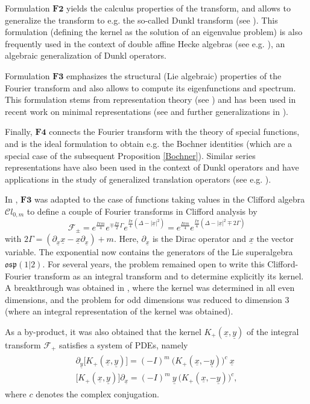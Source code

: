 \documentclass{amsart}
\theoremstyle{remark}
\begin{document}
Formulation $\textbf{F2}$ yields the calculus properties of the transform, and allows to generalize the transform to e.g. the so-called Dunkl transform (see \cite{deJ}). This formulation (defining the kernel as the solution of an eigenvalue problem) is also frequently used in the context of double affine Hecke algebras (see e.g. \cite{C, J}), an algebraic generalization of Dunkl operators. 

Formulation $\textbf{F3}$ emphasizes the structural (Lie algebraic) properties of the Fourier transform and also allows to compute its eigenfunctions and spectrum. This formulation stems from representation theory (see \cite{MR0983366, MR0974332}) and has been used in recent work on minimal representations (see \cite{MR2134314, MR2401813} and further generalizations in \cite{Orsted2}).

Finally, $\textbf{F4}$ connects the Fourier transform with the theory of special functions, and is the ideal formulation to obtain e.g. the Bochner identities (which are a special case of the subsequent Proposition \ref{Bochner}). Similar series representations have also been used in the context of Dunkl operators and have applications in the study of generalized translation operators (see e.g. \cite{MR1973996, DBXu}).

In \cite{MR2190678}, $\textbf{F3}$ was adapted to the case of functions taking values in the Clifford algebra ${\mathcal{C}} l_{0,m}$ to define a couple of Fourier transforms in Clifford analysis by
\[
{\mathcal{F}}_{\pm} =  e^{ \frac{I \pi m}{4}} e^{\mp \frac{I \pi}{2}\Gamma  }e^{\frac{I \pi}{4}(\Delta - |{\underline{x}}|^{2})} = e^{ \frac{I \pi m}{4}} e^{\frac{I \pi}{4}(\Delta - |{\underline{x}}|^{2} \mp 2\Gamma)}
\]
with $2\Gamma= ({\partial_{\underline{x}}} {\underline{x}} - {\underline{x}} {\partial_{\underline{x}}})+m$. Here, ${\partial_{\underline{x}}}$ is the Dirac operator and ${\underline{x}}$ the vector variable. The exponential now contains the generators of the Lie superalgebra $\mathfrak{osp}(1|2)$. For several years, the problem remained open to write this Clifford-Fourier transform as an integral transform and to determine explicitly its kernel. A breakthrough was obtained in \cite{DBXu}, where the kernel was determined in all even dimensions, and the problem for odd dimensions was reduced to dimension 3 (where an integral representation of the kernel was obtained).

As a by-product, it was also obtained that the kernel $K_+({\underline{x}},{\underline{y}})$ of the integral transform ${\mathcal{F}}_{+}$ satisfies a system of PDEs, namely
\begin{align}
\label{CFstelselintro}
\begin{split}
\partial_{\underline{y}} \lbrack K_+({\underline{x}},{\underline{y}}) \rbrack = (-I)^m \ \bigl( K_+({\underline{x}},-{\underline{y}}) \bigr)^c \ {\underline{x}}\\
\lbrack K_+({\underline{x}},{\underline{y}}) \rbrack \partial_{\underline{x}}  =  (-I)^m \ {\underline{y}} \ \bigl( K_+({\underline{x}},-{\underline{y}}) \bigr)^c,
\end{split}
\end{align}
where $c$ denotes the complex conjugation.
\end{document}
